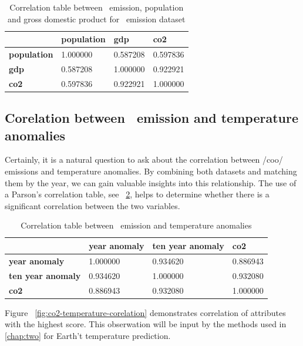 \begin{table}[ht]
\begin{tabular}{ |p{3cm}||p{2cm}|p{2cm}|p{2cm}|  }
 \hline
 & \textbf{population} & \textbf{gdp} & \textbf{co2} \\
 \hline
\textbf{population} &  1.000000 	& 0.587208 	& 0.597836 \\
  \textbf{gdp} &  0.587208  &	1.000000 &	0.922921  \\
  \textbf{co2} &  0.597836 &	0.922921 &	1.000000 \\
 \hline
\end{tabular}
\caption{Correlation table between \coo\ emission, population and gross domestic product for \coo\ emission dataset} 
\label{tab:correlations-co2-pop-gdp}
\end{table}

\subsection{Corelation between \coo\ emission and temperature anomalies}

Certainly, it is a natural question to ask about the correlation between /coo/ emissions and temperature anomalies. By combining both datasets and matching them by the year, we can gain valuable insights into this relationship. The use of a Parson's correlation table, see ~\ref{tab:correlations-co2-annomalies}, helps to determine whether there is a significant correlation between the two variables.

\begin{table}[ht]
\begin{tabular}{ |p{3cm}||p{}|p{3cm}|p{}|  }
 \hline
 & \textbf{year anomaly} & \textbf{ten year anomaly} & \textbf{co2} \\
 \hline
\textbf{year anomaly} &  1.000000 &	0.934620 &	0.886943 \\
  \textbf{ten year anomaly} &  0.934620 &	1.000000 &	0.932080  \\
  \textbf{co2} &  0.886943 	& 0.932080 &	1.000000 \\
 \hline
\end{tabular}
\caption{Correlation table between \coo\ emission and temperature anomalies} 
\label{tab:correlations-co2-annomalies}
\end{table}

Figure ~\ref{fig:co2-temperature-corelation} demonstrates correlation of attributes with the highest score. This obserwation will be input by the methods used in \autoref{chap:two} for Earth't temperature prediction.

